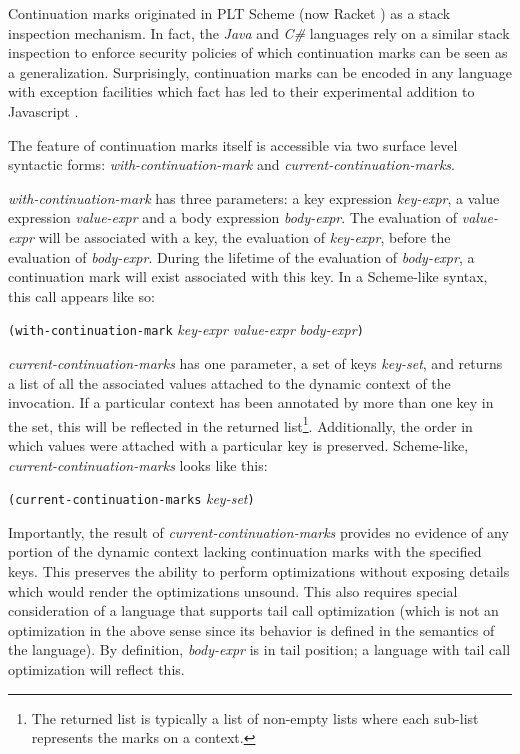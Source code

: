\documentclass[11pt,ms]{byuprop}
\newcounter{definition}
\begin{document}
Continuation marks originated in PLT Scheme (now Racket \cite{plt-tr1}) as a stack 
inspection mechanism. In fact, the \emph{Java} and \emph{C\#} languages rely on a similar 
stack inspection to enforce security policies of which continuation marks can be seen as 
a generalization. Surprisingly, continuation marks can be encoded in any language with 
exception facilities \cite{pettyjohn2005continuations} which fact has led to their 
experimental addition to Javascript \cite{clements2008implementing}.

The feature of continuation marks itself is accessible via two surface level syntactic
forms: \emph{with-continuation-mark} and \emph{current-continuation-marks}.

\emph{with-continuation-mark} has three parameters: a key expression \emph{key-expr}, a 
value expression \emph{value-expr} and a body expression \emph{body-expr}. The evaluation 
of \emph{value-expr} will be associated with a key, the evaluation of \emph{key-expr}, 
before the evaluation of \emph{body-expr}. During the lifetime of the evaluation of 
\emph{body-expr}, a continuation mark will exist associated with this key. In a Scheme-like 
syntax, this call appears like so:

\texttt{(with-continuation-mark} \emph{key-expr} \emph{value-expr} \emph{body-expr}\texttt{)}

\emph{current-continuation-marks} has one parameter, a set of keys \emph{key-set}, and
returns a list of all the associated values attached to the dynamic context of the
invocation. If a particular context has been annotated by more than one key in the set,
this will be reflected in the returned list\footnote{The returned list is typically a list
of non-empty lists where each sub-list represents the marks on a context.}. Additionally,
the order in which values were attached with a particular key is preserved. Scheme-like,
\emph{current-continuation-marks} looks like this:

\texttt{(current-continuation-marks} \emph{key-set}\texttt{)}

Importantly, the result of \emph{current-continuation-marks} provides no evidence of any portion of the
dynamic context lacking continuation marks with the specified keys. This preserves the
ability to perform optimizations without exposing details which would render the
optimizations unsound. This also requires special consideration of a language that
supports tail call optimization (which is not an optimization in the above sense since its
behavior is defined in the semantics of the language). By definition, \emph{body-expr} is 
in tail position; a language with tail call optimization will reflect this.
\end{document}
